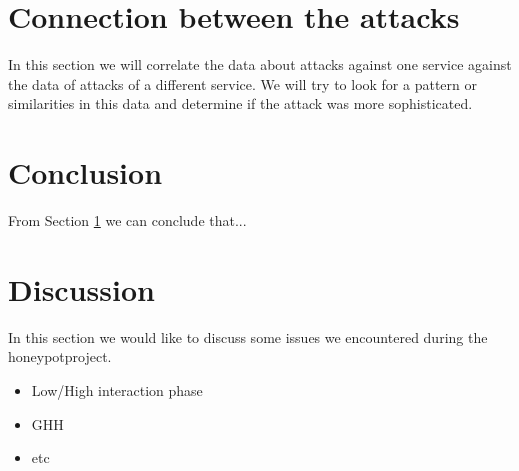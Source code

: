 \documentclass[11pt]{article}
\begin{document}
\section{Connection between the attacks}
\label{Connection}
In this section we will correlate the data about attacks against one service against the data of attacks of a different service. We will try to look for a pattern or similarities in this data and determine if the attack was more sophisticated.


\section{Conclusion}
\label{Conclusion}
From Section \ref{Connection} we can conclude that...



\section{Discussion}
\label{Discussion}
In this section we would like to discuss some issues we encountered during the honeypotproject. 

\begin{itemize}
\item Low/High interaction phase
\item GHH
\item etc
\end{itemize}





\end{document}
